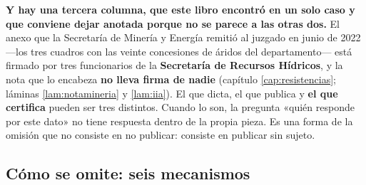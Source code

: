 \textbf{Y hay una tercera columna, que este libro encontró en un solo caso y que conviene dejar
anotada porque no se parece a las otras dos.} El anexo que la Secretaría de Minería y Energía
remitió al juzgado en junio de 2022 ---los tres cuadros con las veinte concesiones de áridos del
departamento--- está firmado por tres funcionarios de la \textbf{Secretaría de Recursos
Hídricos}, y la nota que lo encabeza \textbf{no lleva firma de nadie} (capítulo
\ref{cap:resistencias}; láminas \ref{lam:notamineria} y \ref{lam:iia}). El que dicta, el que
publica y \textbf{el que certifica} pueden ser tres distintos. Cuando lo son, la pregunta «quién
responde por este dato» no tiene respuesta dentro de la propia pieza. Es una forma de la omisión
que no consiste en no publicar: consiste en publicar sin sujeto.

\subsection*{Cómo se omite: seis mecanismos}

